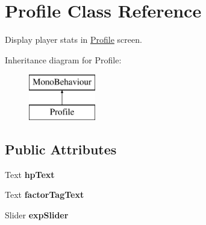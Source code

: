 \hypertarget{class_profile}{}\section{Profile Class Reference}
\label{class_profile}


Display player stats in \mbox{\hyperlink{class_profile}{Profile}} screen.  


Inheritance diagram for Profile\+:\begin{figure}[H]
\begin{center}
\leavevmode
\includegraphics[height=2.000000cm]{class_profile}
\end{center}
\end{figure}
\subsection*{Public Attributes}
\begin{DoxyCompactItemize}
\item 
\mbox{\label{class_profile_a90a096b69972b98844a1d7c1d5693aa2}} 
Text {\bfseries hp\+Text}
\item 
\mbox{\label{class_profile_a7549355a6c1d99e1c531a22a6ea1ff13}} 
Text {\bfseries factor\+Tag\+Text}
\item 
\mbox{\label{class_profile_a0306dcba07967820862a6161008f20c2}} 
Slider {\bfseries exp\+Slider}
\end{DoxyCompactItemize}
